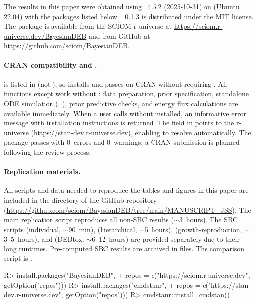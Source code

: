 \documentclass[article,shortnames]{jss}
\begin{document}
The results in this paper were obtained using
~4.5.2 (2025-10-31) on 
(Ubuntu 22.04) with the packages listed below.
~0.1.3 is distributed under the MIT license.
The package is available from the SCIOM r-universe at
\url{https://sciom.r-universe.dev/BayesianDEB} and from GitHub at
\url{https://github.com/sciom/BayesianDEB}.

\paragraph{CRAN compatibility and .}
 is listed in  (not ),
so  installs and passes  on
CRAN without requiring .  All functions except
 work without : data preparation,
prior specification, standalone ODE simulation
(, ), prior predictive
checks, and energy flux calculations are available immediately.
When a user calls  without 
installed, an informative error message with installation
instructions is returned.  The 
field in  points to the  r-universe
(\url{https://stan-dev.r-universe.dev}), enabling
 to resolve automatically.
The package passes  with 0~errors and 0~warnings;
a CRAN submission is planned following the review process.

\paragraph{Replication materials.}
All scripts and data needed to reproduce the tables and figures
in this paper are included in the  directory
of the GitHub repository
(\url{https://github.com/sciom/BayesianDEB/tree/main/MANUSCRIPT_JSS}).
The main replication script  reproduces all
non-SBC results ($\sim$3~hours).  The SBC scripts
 (individual, $\sim$90~min),
 (hierarchical, $\sim$5~hours),
 (growth-reproduction, $\sim$3--5~hours),
and  (DEBtox, $\sim$6--12~hours) are
provided separately due to their long runtimes.  Pre-computed
SBC results are archived in  files.  The 
comparison script is .

\begin{CodeChunk}
\begin{CodeInput}
R> install.packages("BayesianDEB",
+    repos = c("https://sciom.r-universe.dev", getOption("repos")))
R> install.packages("cmdstanr",
+    repos = c("https://stan-dev.r-universe.dev", getOption("repos")))
R> cmdstanr::install_cmdstan()
\end{CodeInput}
\end{CodeChunk}
\end{document}
